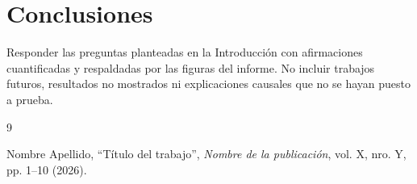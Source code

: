 \documentclass[11pt,a4paper]{article}
\begin{document}
\section{Conclusiones}

Responder las preguntas planteadas en la Introducción con afirmaciones
cuantificadas y respaldadas por las figuras del informe. No incluir trabajos
futuros, resultados no mostrados ni explicaciones causales que no se hayan
puesto a prueba.

\begin{thebibliography}{9}

Nombre Apellido,
``Título del trabajo'',
\textit{Nombre de la publicación}, vol. X, nro. Y, pp. 1--10 (2026).

\end{thebibliography}
\end{document}
